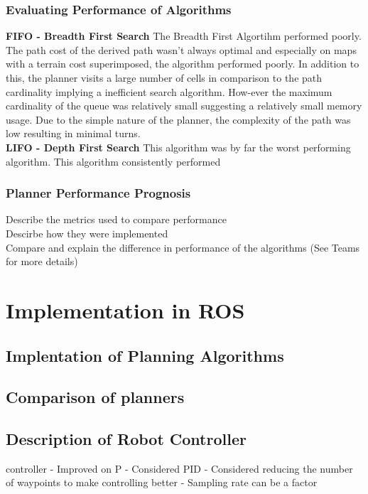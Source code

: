 \documentclass[a4paper,12pt]{article}
\begin{document}
			\subsubsection{Evaluating Performance of Algorithms}
				\textbf{FIFO - Breadth First Search}
				The Breadth First Algortihm performed poorly. The path cost of the derived path wasn't always optimal and especially on maps with a terrain cost superimposed, the algorithm performed poorly. In addition to this, the planner visits a large number of cells in comparison to the path cardinality implying a inefficient search algorithm. How-ever the maximum cardinality of the queue was relatively small suggesting a relatively small memory usage. Due to the simple nature of the planner, the complexity of the path was low resulting in minimal turns.
				\\
				\textbf{LIFO - Depth First Search}
				This algorithm was by far the worst performing algorithm. This algorithm consistently performed 
			\subsubsection{Planner Performance Prognosis}
			
				Describe the metrics used to compare performance \\
				Descirbe how they were implemented \\
				Compare and explain the difference in performance of the algorithms (See Teams for more details)
	

	\section{Implementation in ROS}
	
		\subsection{Implentation of Planning Algorithms}
		
		\subsection{Comparison of planners}
		
		\subsection{Description of Robot Controller}
			controller 
			- Improved on P
			- Considered PID 
			- Considered reducing the number of waypoints to make controlling better 
			- Sampling rate can be a factor 
	
\end{document}
